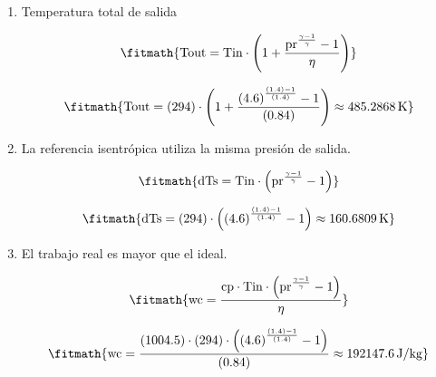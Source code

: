\begin{enumerate}

\item Temperatura total de salida

\[\fitmath{\mathrm{Tout}=\mathrm{Tin}\cdot \left(1+\frac{{\mathrm{pr}}^{\frac{\gamma-1}{\gamma}}-1}{\eta}\right)}\]

\[\fitmath{\mathrm{Tout}=(294)\cdot \left(1+\frac{{(4.6)}^{\frac{(1.4)-1}{(1.4)}}-1}{(0.84)}\right)\approx 485.2868\,\mathrm{K}}\]

\item La referencia isentrópica utiliza la misma presión de salida.

\[\fitmath{\mathrm{dTs}=\mathrm{Tin}\cdot \left({\mathrm{pr}}^{\frac{\gamma-1}{\gamma}}-1\right)}\]

\[\fitmath{\mathrm{dTs}=(294)\cdot \left({(4.6)}^{\frac{(1.4)-1}{(1.4)}}-1\right)\approx 160.6809\,\mathrm{K}}\]

\item El trabajo real es mayor que el ideal.

\[\fitmath{\mathrm{wc}=\frac{\mathrm{cp}\cdot \mathrm{Tin}\cdot \left({\mathrm{pr}}^{\frac{\gamma-1}{\gamma}}-1\right)}{\eta}}\]

\[\fitmath{\mathrm{wc}=\frac{(1004.5)\cdot (294)\cdot \left({(4.6)}^{\frac{(1.4)-1}{(1.4)}}-1\right)}{(0.84)}\approx 192147.6\,\mathrm{J/kg}}\]

\end{enumerate}
